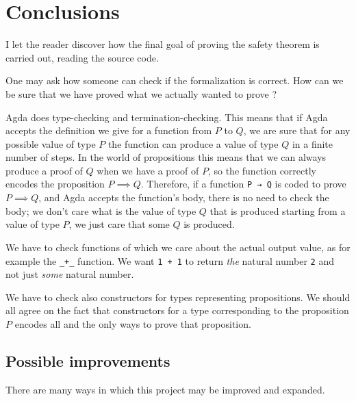 \documentclass{article}
\begin{document}
\section{Conclusions}

I let the reader discover how the final goal of proving the safety theorem is carried out, reading the source code.

One may ask how someone can check if the formalization is correct.
How can we be sure that we have proved what we actually wanted to prove ?

Agda does type-checking and termination-checking.
This means that if Agda accepts the definition we give for a function from $P$ to $Q$, we are sure that for any possible value of type $P$ the function can produce a value of type $Q$ in a finite number of steps.
In the world of propositions this means that we can always produce a proof of $Q$ when we have a proof of $P$, so the function correctly encodes the proposition $P \implies Q$.
Therefore, if a function \texttt{P → Q} is coded to prove $P \implies Q$, and Agda accepts the function's body, there is no need to check the body; we don't care what is the value of type $Q$ that is produced starting from a value of type $P$, we just care that some $Q$ is produced.

We have to check functions of which we care about the actual output value, as for example the \texttt{\_+\_} function.
We want \texttt{1 + 1} to return \textit{the} natural number \texttt{2} and not just \textit{some} natural number. 

We have to check also constructors for types representing propositions.
We should all agree on the fact that constructors for a type corresponding to the proposition $P$ encodes all and the only ways to prove that proposition.


\subsection{Possible improvements}
There are many ways in which this project may be improved and expanded.
\end{document}
